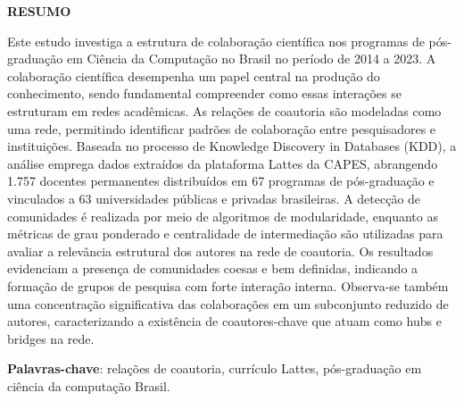 \cleardoublepage
\begin{titlepage}
\centering
\textbf{\large RESUMO} %
\vspace{1cm}


\justifying
Este estudo investiga a estrutura de colaboração científica nos programas de pós-graduação em Ciência da Computação no Brasil no período de 2014 a 2023. A colaboração científica desempenha um papel central na produção do conhecimento, sendo fundamental compreender como essas interações se estruturam em redes acadêmicas. As relações de
coautoria são modeladas como uma rede, permitindo identificar padrões de colaboração entre pesquisadores e instituições. Baseada no processo de Knowledge Discovery in Databases (KDD), a análise emprega dados extraídos da plataforma Lattes da CAPES, abrangendo 1.757 docentes permanentes distribuídos em 67 programas de pós-graduação e vinculados a 63 universidades públicas e privadas brasileiras. A detecção de comunidades é
realizada por meio de algoritmos de modularidade, enquanto as métricas de grau ponderado e centralidade de intermediação são utilizadas para avaliar a relevância estrutural dos autores na rede de coautoria. Os resultados evidenciam a presença de comunidades coesas e bem definidas, indicando a formação de grupos de pesquisa com forte interação interna. Observa-se também uma concentração significativa das colaborações em um subconjunto reduzido de autores, caracterizando a existência de coautores-chave que atuam como hubs e bridges na rede.

\vspace{0.5cm}

 \textbf{Palavras-chave}: rela\c{c}\~{o}es de coautoria, curr\'{i}culo Lattes, p\'{o}s-gradua\c{c}\~{a}o em ci\^{e}ncia da computa\c{c}\~{a}o Brasil.
\end{titlepage}


